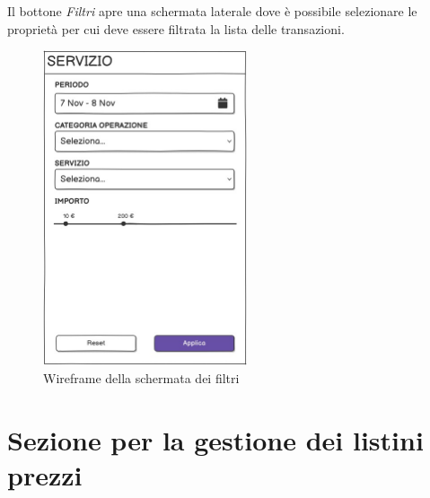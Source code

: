 Il bottone \textit{Filtri} apre una schermata laterale dove \`e possibile selezionare le propriet\`a per cui deve essere filtrata la lista delle transazioni.

\begin{figure}[H]
  \centering
  \includegraphics[width=6cm]{images/gestione-wallet/mock-filtri-ricerca.png}
  \caption{Wireframe della schermata dei filtri}
\end{figure}

\section{Sezione per la gestione dei listini prezzi}
